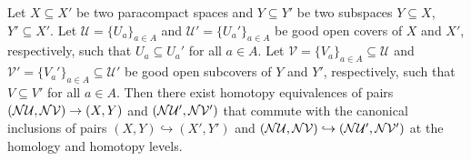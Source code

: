 \begin{lemma}\label{lem:rel_pers_nerve}
  Let $X\subseteq X'$ be two paracompact spaces and $Y\subseteq Y'$ be two subspaces $Y\subseteq X$, $Y'\subseteq X'$.
  Let $\mathcal{U} = \{U_a\}_{a\in A}$ and $\mathcal{U}' = \{U_a'\}_{a\in A}$ be good open covers of $X$ and $X'$, respectively, such that $U_a\subseteq U_a'$ for all $a\in A$.
  Let $\mathcal{V} = \{V_a\}_{a\in A} \subseteq \mathcal{U}$ and $\mathcal{V}' = \{V_a'\}_{a\in A}\subseteq \mathcal{U}'$ be good open subcovers of $Y$ and $Y'$, respectively, such that $V\subseteq V'$ for all $a\in A$.
  Then there exist homotopy equivalences of pairs $(\mathcal{N}\mathcal{U}, \mathcal{N}\mathcal{V})\to (X, Y)$ and $(\mathcal{N}\mathcal{U}', \mathcal{N}\mathcal{V}')$ that commute with the canonical inclusions of pairs $(X, Y)\hookrightarrow (X', Y')$ and $(\mathcal{N}\mathcal{U}, \mathcal{N}\mathcal{V})\hookrightarrow (\mathcal{N}\mathcal{U}', \mathcal{N}\mathcal{V}')$ at the homology and homotopy levels.
\end{lemma}

%

